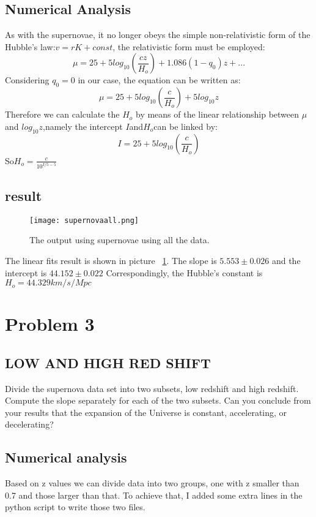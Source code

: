 \documentclass[11pt,letterpaper]{article}
\begin{document}
\subsection{Numerical Analysis}
As with the supernovae, it no longer obeys the simple non-relativistic form of the Hubble's law:$v=rK+const$, the relativistic form must be employed:
$$
\mu=25+5log_{10}(\frac{cz}{H_o})+1.086(1-q_0)z+...
$$
Considering $q_0=0$ in our case, the equation can be written as:
$$
\mu=25+5log_{10}(\frac{c}{H_o})+5log_{10}z
$$
Therefore we can calculate the $H_o$ by means of the linear relationship between $\mu$ and $log_{10}z$,namely the intercept $I$and$H_o$can be linked by:
$$
I=25+5log_{10}(\frac{c}{H_o})
$$ 
So$H_o=\frac{c}{10^{{I/5}-5}}$

\subsection{result}

\begin{figure}
\begin{center}
\texttt{[image: supernovaall.png]}
\caption{The output using supernovae using all the data.}
\label{figure4}
\end{center}
\end{figure}

The linear fits result is shown in picture ~\ref{figure4}.
The slope is $5.553\pm0.026$ and the intercept is $44.152\pm0.022$
Correspondingly, the Hubble's constant is $H_o=44.329km/s/Mpc$

\newpage
\section{Problem 3}
\subsection{LOW AND HIGH RED SHIFT}
Divide the supernova data set into two subsets, low redshift and high redshift. Compute the slope separately for each of the two subsets. Can you conclude from your results that the expansion of the Universe is constant, accelerating, or decelerating?
\subsection{Numerical analysis} 
Based on z values we can divide data into two groups, one with z smaller than 0.7 and those larger than that.
To achieve that, I added some extra lines in the python script to write those two files.
\end{document}
